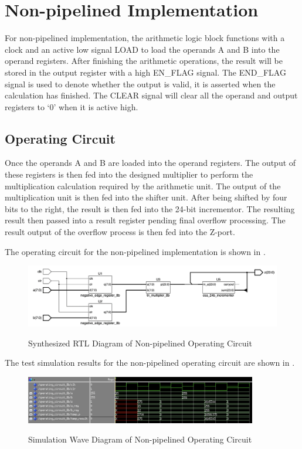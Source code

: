 \section{Non-pipelined Implementation}

For non-pipelined implementation, the arithmetic logic block functions with a clock
and an active low signal LOAD to load the operands A and B into the operand registers.
After finishing the arithmetic operations, the result will be stored in the output register with a high EN\_FLAG signal.
The END\_FLAG signal is used to denote whether the output is valid, it is asserted when the calculation has finished.
The CLEAR signal will clear all the operand and output registers to ‘0’ when it is active high.

\subsection{Operating Circuit}

Once the operands A and B are loaded into the operand registers.
The output of these registers is then fed into the designed multiplier to perform the multiplication calculation required by the arithmetic unit.
The output of the multiplication unit is then fed into the shifter unit.
After being shifted by four bits to the right, the result is then fed into the 24-bit incrementor.
The resulting result then passed into a result register pending final overflow processing.
The result output of the overflow process is then fed into the Z-port.

\noindent The operating circuit for the non-pipelined implementation is shown in .

\begin{figure}[!htp]
	\centering
	\caption{Synthesized RTL Diagram of Non-pipelined Operating Circuit}
	\includegraphics[width=\textwidth]{../img/non_p_op_rtl.png}
	\label{fig:non_p_op_rtl}
\end{figure}

The test simulation results for the non-pipelined operating circuit are shown in .

\begin{figure}[!htp]
	\centering
	\caption{Simulation Wave Diagram of Non-pipelined Operating Circuit}
	\includegraphics[width=0.9\textwidth]{../img/non_p_op_sim.png}
	\label{fig:non_p_op_sim}
\end{figure}

